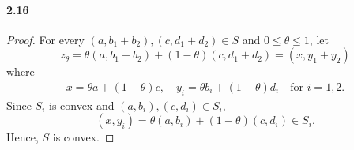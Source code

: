 \paragraph{2.16}
\begin{proof}
  For every $(a,b_1+b_2),(c,d_1+d_2)\in S$ and $0\le\theta\le 1$, let 
  \[
    z_\theta = \theta(a,b_1+b_2)+(1-\theta)(c,d_1+d_2) = (x,y_1+y_2)
  \]
  where
  \begin{align*}
    x = \theta a+(1-\theta) c,\quad
    y_i = \theta b_i+(1-\theta)d_i\quad\text{for $i=1,2$}.
  \end{align*}
  Since $S_i$ is convex and $(a,b_i),(c,d_i)\in S_i$,
  \[
    (x,y_i)=\theta(a,b_i) + (1-\theta)(c,d_i)\in S_i.
  \]
  Hence, $S$ is convex.
\end{proof}

\fi


